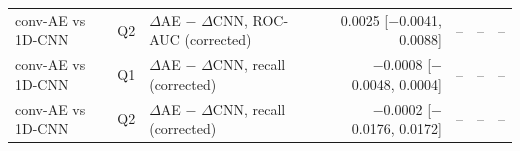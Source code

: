 \begin{table}[t]
\begin{tabular}{@{}lllrrrr@{}}
conv-AE vs 1D-CNN & Q2 & $\Delta$AE $-$ $\Delta$CNN, ROC-AUC (corrected) & 0.0025 [$-$0.0041, 0.0088] & -- & -- & -- \\
conv-AE vs 1D-CNN & Q1 & $\Delta$AE $-$ $\Delta$CNN, recall (corrected) & $-$0.0008 [$-$0.0048, 0.0004] & -- & -- & -- \\
conv-AE vs 1D-CNN & Q2 & $\Delta$AE $-$ $\Delta$CNN, recall (corrected) & $-$0.0002 [$-$0.0176, 0.0172] & -- & -- & -- \\
\bottomrule
\end{tabular}
\end{table}

